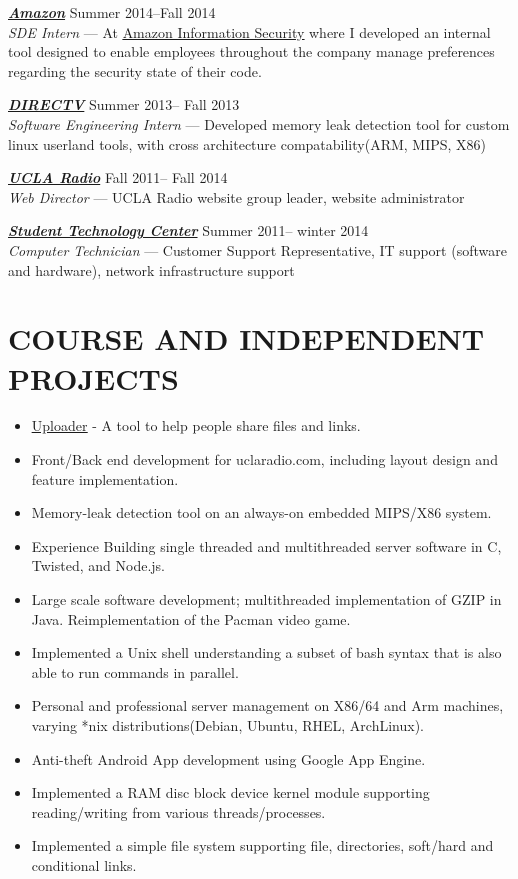 \documentclass[line,letterpaper]{resume}
\begin{document}
\begin{resume}
	{\sl\textbf{\href{www.amazon.com}{Amazon}}} \hfill Summer 2014--Fall 2014\\
    \emph{SDE Intern} --- At \underline{\href{http://security.amazon-jobs.com/index.html}
    {Amazon Information Security}} where I developed an internal tool designed to
	enable employees throughout the company manage preferences regarding the
	security state of their code.

    {\sl\textbf{\href{www.directv.com}{DIRECTV}}} \hfill Summer 2013-- Fall 2013\\
    \emph{Software Engineering Intern}
    ---  Developed memory leak detection tool for custom linux userland tools,
	with cross architecture compatability(ARM, MIPS, X86)

    {\sl\textbf{\href{www.uclaradio.com}{UCLA Radio}}} \hfill Fall 2011-- Fall 2014\\
    \emph{Web Director} --- UCLA Radio website group leader, website administrator

    {\sl\textbf{\href{https://housing.ucla.edu/residence-hall-computing}
	{Student Technology Center}}} \hfill Summer 2011-- winter 2014\\
    \emph{Computer Technician} --- Customer Support Representative,
IT support (software and hardware), network infrastructure support
    \vspace{-6pt}


    \section{\uppercase{Course and Independent Projects}}
	\begin{itemize}
	\item \underline{\href{https://github.com/naclander/uploader}{Uploader}} -
	A tool to help people share files and links.
	\item Front/Back end development for uclaradio.com, including layout design
	      and feature implementation.
	\item Memory-leak detection tool on an always-on embedded MIPS/X86 system.
	\item Experience Building single threaded and multithreaded server software
	      in C, Twisted, and Node.js.
	\item Large scale software development; multithreaded implementation of GZIP
	      in Java. Reimplementation of the Pacman video game.
	\item Implemented a Unix shell understanding a subset of bash syntax
	that is also able to run commands in parallel.
	\item Personal and professional server management on X86/64 and Arm machines,
	varying *nix distributions(Debian, Ubuntu, RHEL, ArchLinux).
	\item Anti-theft Android App development using Google App Engine.
	\item Implemented a RAM disc block device kernel module supporting
	reading/writing from various threads/processes.
	\item Implemented a simple file system supporting file, directories,
	soft/hard and conditional links.
	\end{itemize}
    \vspace{-6pt}


\end{resume}
\end{document}
